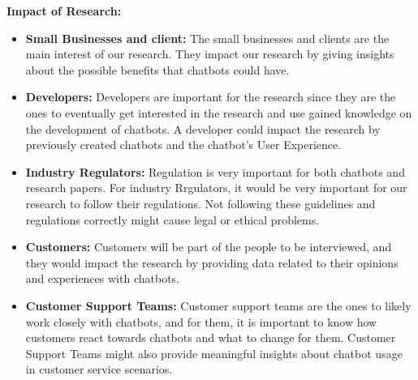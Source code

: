 \documentclass[a4paper]{article}
\begin{document}
\textbf{Impact of Research:}
\begin{itemize}
    \item \textbf{Small Businesses and client:} The small businesses and clients are the main interest of our research. They impact our research by giving insights about the possible benefits that chatbots could have.
    \item \textbf{Developers:} Developers are important for the research since they are the ones to eventually get interested in the research and use gained knowledge on the development of chatbots. A developer could impact the research by previously created chatbots and the chatbot’s User Experience.
    \item \textbf{Industry Regulators:} Regulation is very important for both chatbots and research papers. For industry Rrgulators, it would be very important for our research to follow their regulations. Not following these guidelines and regulations correctly might cause legal or ethical problems.
    \item \textbf{Customers:} Customers will be part of the people to be interviewed, and they would impact the research by providing data related to their opinions and experiences with chatbots.
    \item \textbf{Customer Support Teams:} Customer support teams are the ones to likely work closely with chatbots, and for them, it is important to know how customers react towards chatbots and what to change for them. Customer Support Teams might also provide meaningful insights about chatbot usage in customer service scenarios.
\end{itemize}
\end{document}
